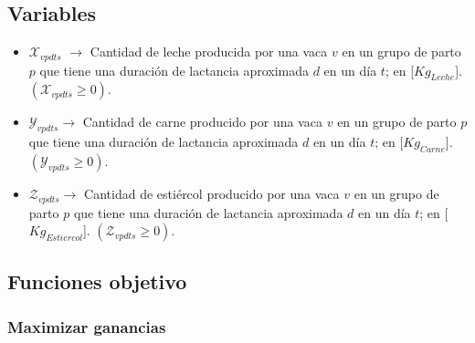 \subsection{Variables}
\begin{itemize}
    \item \textbf{$\mathcal{X}_{vpdts}$} $\longrightarrow$ Cantidad de leche producida por una vaca $v$ en un grupo de parto $p$ que tiene una duración de lactancia aproximada $d$ en un día $t$; en [$Kg_{Leche}$]. $\left(\mathcal{X}_{vpdts}\geq 0 \right)$.
    \item \textbf{$\mathcal{Y}_{vpdts}$}$\longrightarrow$ Cantidad de carne producido por una vaca $v$ en un grupo de parto $p$ que tiene una duración de lactancia aproximada $d$ en un día $t$; en [$Kg_{Carne}$].  $\left(\mathcal{Y}_{vpdts}\geq 0 \right)$.
    \item \textbf{$\mathcal{Z}_{vpdts}$}$\longrightarrow$ Cantidad de estiércol producido por una vaca $v$ en un grupo de parto $p$ que tiene una duración de lactancia aproximada $d$ en un día $t$; en [$Kg_{Estiercol}$].  $\left(\mathcal{Z}_{vpdts}\geq 0 \right)$.
\end{itemize}

\subsection{Funciones objetivo}

\subsubsection{Maximizar ganancias}


